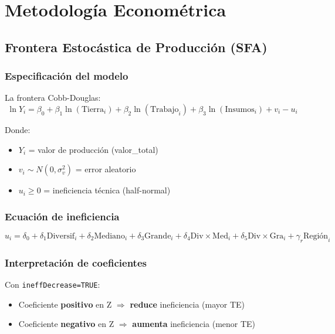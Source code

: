 \documentclass[11pt,a4paper]{article}
\begin{document}
\section{Metodología Econométrica}

\subsection{Frontera Estocástica de Producción (SFA)}

\subsubsection{Especificación del modelo}
La frontera Cobb-Douglas:
\[
\ln Y_i = \beta_0 + \beta_1 \ln(\text{Tierra}_i) + \beta_2 \ln(\text{Trabajo}_i) + \beta_3 \ln(\text{Insumos}_i) + v_i - u_i
\]

Donde:
\begin{itemize}
    \item $Y_i$ = valor de producción (valor\_total)
    \item $v_i \sim N(0, \sigma_v^2)$ = error aleatorio
    \item $u_i \geq 0$ = ineficiencia técnica (half-normal)
\end{itemize}

\subsubsection{Ecuación de ineficiencia}
\[
u_i = \delta_0 + \delta_1 \text{Diversif}_i + \delta_2 \text{Mediano}_i + \delta_3 \text{Grande}_i + \delta_4 \text{Div} \times \text{Med}_i + \delta_5 \text{Div} \times \text{Gra}_i + \gamma_r \text{Región}_i
\]

\subsubsection{Interpretación de coeficientes}
Con \texttt{ineffDecrease=TRUE}:
\begin{itemize}
    \item Coeficiente \textbf{positivo} en Z $\Rightarrow$ \textbf{reduce} ineficiencia (mayor TE)
    \item Coeficiente \textbf{negativo} en Z $\Rightarrow$ \textbf{aumenta} ineficiencia (menor TE)
\end{itemize}
\end{document}
